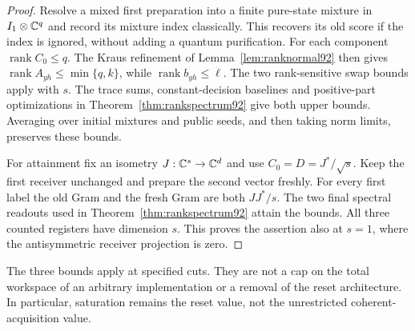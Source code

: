 \begin{proof}
Resolve a mixed first preparation into a finite pure-state mixture in
$I_1\otimes\mathbb C^q$ and record its mixture index classically.  This
recovers its old score if the index is ignored, without adding a quantum
purification.  For each component $\operatorname{rank}C_0\le q$.
The Kraus refinement of Lemma~\ref{lem:ranknormal92} then gives
$\operatorname{rank}A_{yh}\le\min\{q,k\}$, while
$\operatorname{rank}b_{yh}\le\ell$.  The two rank-sensitive swap
bounds apply with $s$.  The trace sums, constant-decision baselines
and positive-part optimizations in Theorem~\ref{thm:rankspectrum92}
give both upper bounds.  Averaging over initial mixtures and public
seeds, and then taking norm limits, preserves these bounds.

For attainment fix an isometry $J:\mathbb C^s\to\mathbb C^d$ and use
$C_0=D=J^*/\sqrt s$.  Keep the first receiver unchanged and prepare
the second vector freshly.  For every first label the old Gram and
the fresh Gram are both $JJ^*/s$.  The two final spectral readouts
used in Theorem~\ref{thm:rankspectrum92} attain the bounds.  All
three counted registers have dimension $s$.  This proves the assertion
also at $s=1$, where the antisymmetric receiver projection is zero.
\end{proof}
The three bounds apply at specified cuts.  They are not a cap on the
total workspace of an arbitrary implementation or a removal of the
reset architecture.  In particular, saturation remains the reset
value, not the unrestricted coherent-acquisition value.

